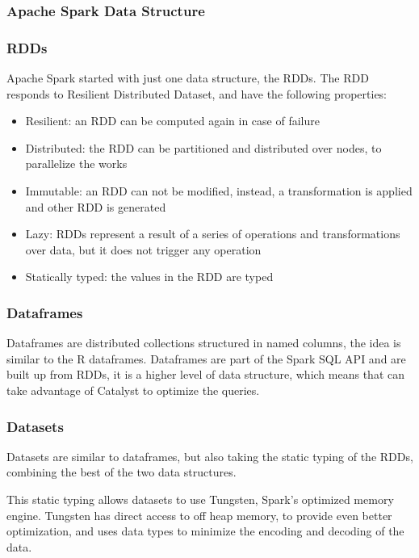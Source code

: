\documentclass[11pt]{article} %
\begin{document}
    \subsubsection{Apache Spark Data Structure}

      \subsubsection*{RDDs}

        Apache Spark started with just one data structure, the RDDs. The RDD responds to Resilient Distributed Dataset, and have the following properties:

        \begin{itemize}
          \item Resilient: an RDD can be computed again in case of failure
          \item Distributed: the RDD can be partitioned and distributed over nodes, to parallelize the works
          \item Immutable: an RDD can not be modified, instead, a transformation is applied and other RDD is generated
          \item Lazy: RDDs represent a result of a series of operations and transformations over data, but it does not trigger any operation
          \item Statically typed: the values in the RDD are typed
        \end{itemize}

      \subsubsection*{Dataframes}

        Dataframes are distributed collections structured in named columns, the idea is similar to the R dataframes. Dataframes are part of the Spark SQL API and are built up from RDDs, it is a higher level of data structure, which means that can take advantage of Catalyst to optimize the queries.

      \subsubsection*{Datasets}

        Datasets are similar to dataframes, but also taking the static typing of the RDDs, combining the best of the two data structures.

        This static typing allows datasets to use Tungsten, Spark's optimized memory engine. Tungsten has direct access to off heap memory, to provide even better optimization, and uses data types to minimize the encoding and decoding of the data.
\end{document}
